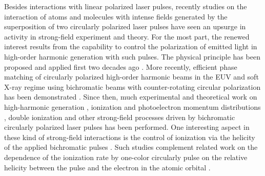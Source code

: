 Besides interactions with linear polarized laser pulses, recently studies on the interaction of atoms and molecules with intense fields generated by the superposition of two circularly polarized laser pulses have seen an upsurge in activity in strong-field experiment and theory. For the most part, the renewed interest results from the capability to control the polarization of emitted light in high-order harmonic generation with such pulses. The physical principle has been proposed and applied first two decades ago 
\cite{eichmann1995,long1995}. 
More recently, efficient phase matching of circularly polarized high-order harmonic beams in the EUV and soft X-ray regime using bichromatic beams with counter-rotating circular polarization has been demonstrated \cite{fleischer2014,pisanty2014,kfir2015,fan2015,hickstein2015}. Since then, much experimental and theoretical work on high-harmonic generation \cite{milosevic2015a,medisauskas2015,milosevic2015b,chen2016,baykusheva2016,hernandez2016,liu2016,mauger2016,bandrauk2016,reich2016b,odzak2016,dorney2017,fleischer2017,zhavoronkov2017,pisanty2017,baykusheva2017,lerner2017,ayuso2018,dixit2018,barreau2018,huang2018,jimenez2018,heslar2018,paufler2018,li2019}, 
ionization and photoelectron momentum distributions
\cite{ngoko2015,yuan2016,milosevic2016c,mancuso2016,milosevic2016b,mancuso2017,pengel2017,busuladzic2017,hoang2017,lin2017,abusamha2018,busuladzic2018,eckart2018,li2018,han2018,eckart2018b,liu2018,eicke2019,ge2019,kerbstadt2019,abusamha2019}, double ionization 
\cite{mancuso2016b,eckart2016,ben2017,ngoko2017,yu2018,huang2018b,ma2019}
and other strong-field processes \cite{yuan2015,buica2018,guo2019} driven by bichromatic circularly polarized laser pulses has been performed. One interesting aspect in these kind of strong-field interactions is the control of ionization via the helicity of the applied bichromatic pulses \cite{milosevic2016c,mancuso2016,liu2018}. Such studies complement related work on the dependence of the ionization rate by one-color circularly pulse on the relative helicity between the pulse and the electron in the atomic orbital
\cite{barth2011,kazansky2012,herath2012,barth2013,bauer2014,barth2014,ooi2014,hartung2016,douguet2016,watzel2016,wang2017,zhang2017,eckart2018c,liu2018b,trabert2018}.

